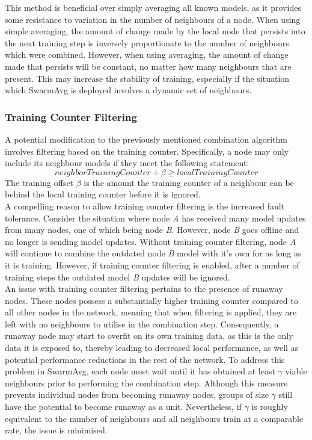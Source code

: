 \documentclass[letterpaper, 10 pt, conference]{ieeeconf}  %
\begin{document}
This method is beneficial over simply averaging all known models, as it provides some resistance to variation in the number of neighbours of a node. When using simple averaging, the amount of change made by the local node that persists into the next training step is inversely proportionate to the number of neighbours which were combined. However, when using averaging, the amount of change made that persists will be constant, no matter how many neighbours that are present. This may increase the stability of training, especially if the situation which SwarmAvg is deployed involves a dynamic set of neighbours.

\subsubsection{Training Counter Filtering}
A potential modification to the previously mentioned combination algorithm involves filtering based on the training counter. Specifically, a node may only include its neighbour models if they meet the following statement:
\[neighborTrainingCounter + \beta \ge localTrainingCounter \]
The training offset $\beta$ is the amount the training counter of a neighbour can be behind the local training counter before it is ignored. \\

A compelling reason to allow training counter filtering is the increased fault tolerance. Consider the situation where node \emph{A} has received many model updates from many nodes, one of which being node \emph{B}. However, node \emph{B} goes offline and no longer is sending model updates. Without training counter filtering, node \emph{A} will continue to combine the outdated node \emph{B} model with it's own for as long as it is training. However, if training counter filtering is enabled, after a number of training steps the outdated model \emph{B} updates will be ignored. \\

An issue with training counter filtering pertains to the presence of runaway nodes. These nodes possess a substantially higher training counter compared to all other nodes in the network, meaning that when filtering is applied, they are left with no neighbours to utilise in the combination step. Consequently, a runaway node may start to overfit on its own training data, as this is the only data it is exposed to, thereby leading to decreased local performance, as well as potential performance reductions in the rest of the network. To address this problem in SwarmAvg, each node must wait until it has obtained at least $\gamma$ viable neighbours prior to performing the combination step. Although this measure prevents individual nodes from becoming runaway nodes, groups of size $\gamma$ still have the potential to become runaway as a unit. Nevertheless, if $\gamma$ is roughly equivalent to the number of neighbours and all neighbours train at a comparable rate, the issue is minimised.
\end{document}
